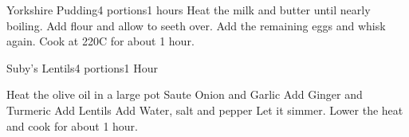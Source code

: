 \documentclass{article}
\begin{document}
\begin{recipe}{Yorkshire Pudding}{4 portions}{1 hours}
Heat the milk and butter until nearly boiling. Add flour and allow to
seeth over.
Add the remaining eggs and whisk again. Cook at 220\0C for about 1 hour.
\end{recipe}

\begin{recipe}{Suby's Lentils}{4 portions}{1 Hour}
    
Heat the olive oil in a large pot
Saute Onion and Garlic
Add Ginger and Turmeric
Add Lentils
Add Water, salt and pepper
Let it simmer. Lower the heat and cook for about 1 hour.

\end{recipe}
\end{document}
